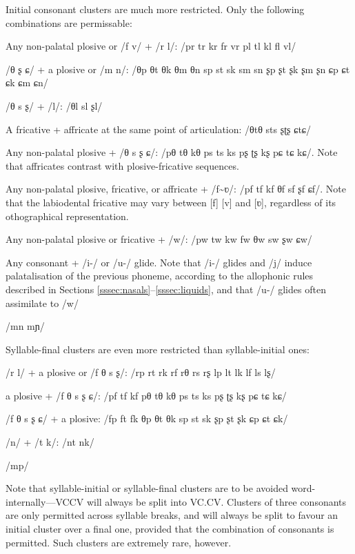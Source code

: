 \documentclass[grammar]{subfiles}
\begin{document}
	Initial consonant clusters are much more restricted. Only the following combinations are permissable:

	\begin{itemize*}
	\item Any non-palatal plosive or /f v/ + /r l/: /pr tr kr fr vr pl tl kl fl vl/ 
	\item /θ ʂ ɕ/ + a plosive or /m n/: /θp θt θk θm θn sp st sk sm sn ʂp ʂt ʂk ʂm ʂn ɕp ɕt ɕk ɕm ɕn/
	\item /θ s ʂ/ + /l/: /θl sl ʂl/
	\item A fricative + affricate at the same point of articulation: /θtθ sts ʂʈʂ ɕtɕ/
	\item Any non-palatal plosive + /θ s ʂ ɕ/: /pθ tθ kθ ps ts ks pʂ ʈʂ kʂ pɕ tɕ kɕ/. Note that affricates contrast with plosive-fricative sequences.
	\item Any non-palatal plosive, fricative, or affricate + /f\textasciitilde ʋ/: /pf tf kf θf sf ʂf ɕf/. Note that the labiodental fricative may vary between [f] [v] and [ʋ], regardless of its othographical representation.
	\item Any non-palatal plosive or fricative + /w/: /pw tw kw fw θw sw ʂw ɕw/
	\item Any consonant + /i-/ or /u-/ glide. Note that /i-/ glides and /j/ induce palatalisation of the previous phoneme, according to the allophonic rules described in Sections \ref{sssec:nasals}–\ref{sssec:liquids}, and that /u-/ glides often assimilate to /w/
	\item /mn mɲ/
	\end{itemize*}

	Syllable-final clusters are even more restricted than syllable-initial ones:

	\begin{itemize*}
	\item /r l/ + a plosive or /f θ s ʂ/: /rp rt rk rf rθ rs rʂ lp lt lk lf ls lʂ/
	\item a plosive + /f θ s ʂ ɕ/: /pf tf kf pθ tθ kθ ps ts ks pʂ ʈʂ kʂ pɕ tɕ kɕ/
	\item /f θ s ʂ ɕ/ + a plosive: /fp ft fk θp θt θk sp st sk ʂp ʂt ʂk ɕp ɕt ɕk/
	\item /n/ + /t k/: /nt nk/
	\item /mp/
	\end{itemize*}

	Note that syllable-initial or syllable-final clusters are to be avoided word-internally—VCCV will always be split into VC.CV\@. Clusters of three consonants are only permitted across syllable breaks, and will always be split to favour an initial cluster over a final one, provided that the combination of consonants is permitted. Such clusters are extremely rare, however.
\end{document}

